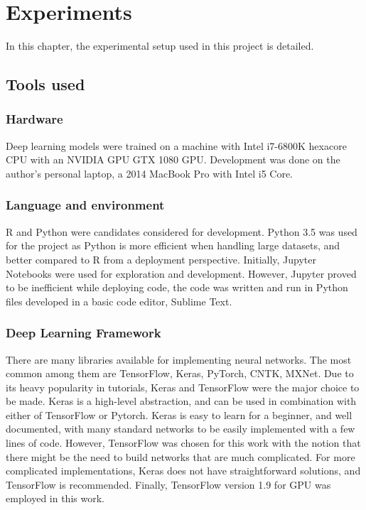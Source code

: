 
\chapter{Experiments}

In this chapter, the experimental setup used in this project is detailed.
\section{Tools used}

\subsection{Hardware}
Deep learning models were trained on a machine with Intel i7-6800K hexacore CPU with an NVIDIA GPU GTX 1080 GPU. Development was done on the author's personal laptop, a 2014 MacBook Pro with Intel i5 Core.

\subsection{Language and environment}
R and Python were candidates considered for development. Python 3.5 was used for the project as Python is more efficient when handling large datasets, and better compared to R from a deployment perspective.
Initially, Jupyter Notebooks were used for exploration and development. However, Jupyter proved to be inefficient while deploying code, the code was written and run in Python files developed in a basic code editor, Sublime Text\cite{noauthor_sublime_nodate}. 

\subsection{Deep Learning Framework}
There are many libraries available for implementing neural networks. The most common among them are TensorFlow\cite{noauthor_TensorFlow:_2018}, Keras\cite{noauthor_keras_nodate}, PyTorch\cite{noauthor_pytorch_nodate}, CNTK\cite{noauthor_microsoft_2018}, MXNet\cite{noauthor_incubator-mxnet:_2018}. Due to its heavy popularity in tutorials, Keras and TensorFlow were the major choice to be made. Keras is a high-level abstraction, and can be used in combination with either of TensorFlow or Pytorch. Keras is easy to learn for a beginner, and well documented, with many standard networks to be easily implemented with a few lines of code. However, TensorFlow was chosen for this work with the notion that there might be the need to build networks that are much complicated. For more complicated implementations, Keras does not have straightforward solutions, and TensorFlow is recommended. 
Finally, TensorFlow version 1.9 for GPU was employed in this work.

